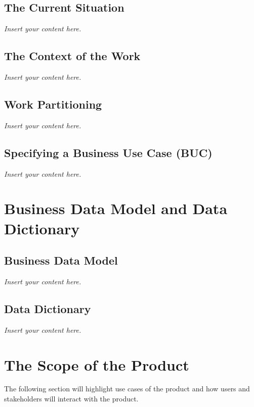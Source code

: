 \documentclass[12pt]{article}
\newcommand{\lips}{\textit{Insert your content here.}}
\begin{document}
\subsection{The Current Situation}
\lips
\subsection{The Context of the Work}
\lips
\subsection{Work Partitioning}
\lips
\subsection{Specifying a Business Use Case (BUC)}
\lips

\section{Business Data Model and Data Dictionary}
\subsection{Business Data Model}
\lips
\subsection{Data Dictionary}
\lips

\section{The Scope of the Product}
The following section will highlight use cases of the product and how users and
stakeholders will interact with the product.  
\end{document}
